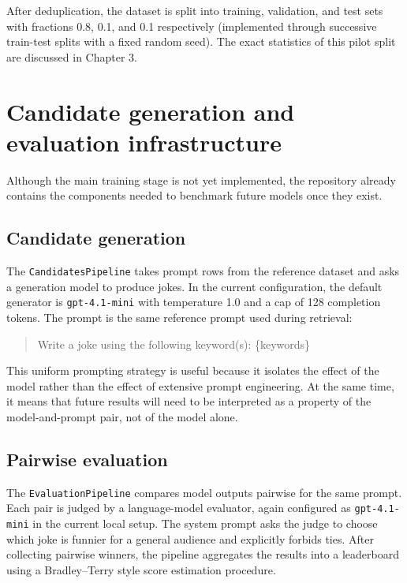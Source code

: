 \documentclass[14pt,a4paper]{extreport}
\begin{document}
After deduplication, the dataset is split into training, validation, and test sets with fractions 0.8, 0.1, and 0.1 respectively (implemented through successive train-test splits with a fixed random seed). The exact statistics of this pilot split are discussed in Chapter 3.

\section{Candidate generation and evaluation infrastructure}

Although the main training stage is not yet implemented, the repository already contains the components needed to benchmark future models once they exist.

\subsection{Candidate generation}

The \texttt{CandidatesPipeline} takes prompt rows from the reference dataset and asks a generation model to produce jokes. In the current configuration, the default generator is \texttt{gpt-4.1-mini} with temperature 1.0 and a cap of 128 completion tokens. The prompt is the same reference prompt used during retrieval:
\begin{quote}
  \ttfamily
  Write a joke using the following keyword(s): \{keywords\}
\end{quote}

This uniform prompting strategy is useful because it isolates the effect of the model rather than the effect of extensive prompt engineering. At the same time, it means that future results will need to be interpreted as a property of the model-and-prompt pair, not of the model alone.

\subsection{Pairwise evaluation}

The \texttt{EvaluationPipeline} compares model outputs pairwise for the same prompt. Each pair is judged by a language-model evaluator, again configured as \texttt{gpt-4.1-mini} in the current local setup. The system prompt asks the judge to choose which joke is funnier for a general audience and explicitly forbids ties. After collecting pairwise winners, the pipeline aggregates the results into a leaderboard using a Bradley--Terry style score estimation procedure.
\end{document}
